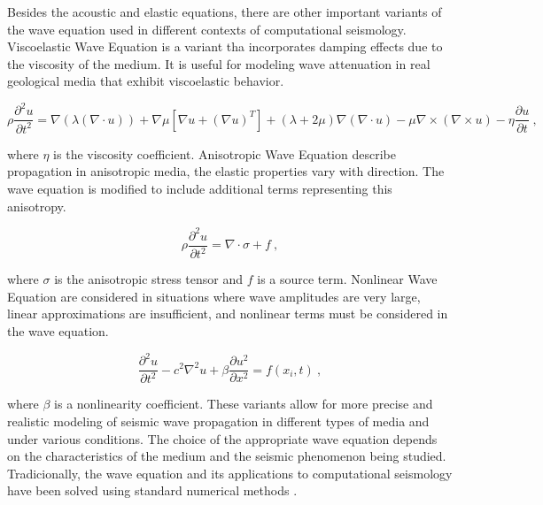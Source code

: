 \documentclass[11pt,twoside]{article}
\begin{document}
Besides the acoustic and elastic equations, there are other important variants of the wave equation used in different 
contexts of computational seismology. Viscoelastic Wave Equation is a variant tha incorporates damping effects due to 
the viscosity of the medium. It is useful for modeling wave attenuation in real geological media that exhibit 
viscoelastic behavior.

\begin{equation*}
\rho \frac{\partial^2 u}{\partial t^2} = \nabla (\lambda (\nabla \cdot u)) + \nabla \mu \left[\nabla u + 
(\nabla u)^T\right] + (\lambda + 2\mu) \nabla (\nabla \cdot u) - \mu \nabla \times (\nabla \times u) - 
\eta \frac{\partial u}{\partial t} \ ,
\label{viscoelastic}
\end{equation*}
    
where $\eta$ is the viscosity coefficient. Anisotropic Wave Equation describe propagation in anisotropic media, 
the elastic properties vary with direction. The wave equation is modified to include additional terms representing 
this anisotropy.

\begin{equation*}
\rho \frac{\partial^2 u}{\partial t^2} = \nabla \cdot \sigma + f \ ,
\label{anisotropic}
\end{equation*}
    
where $\sigma$ is the anisotropic stress tensor and $f$ is a source term. Nonlinear Wave Equation are considered 
in situations where wave amplitudes are very large, linear approximations are insufficient, and nonlinear terms 
must be considered in the wave equation.

\begin{equation*}
\frac{\partial^2 u}{\partial t^2} - c^2 \nabla^2 u + \beta \frac{\partial u^2}{\partial x^2} = f(x_i, t) \ ,
\label{nonlinear}
\end{equation*}
    
where $\beta$ is a nonlinearity coefficient. These variants allow for more precise and realistic modeling 
of seismic wave propagation in different types of media and under various conditions. The choice of the 
appropriate wave equation depends on the characteristics of the medium and the seismic phenomenon being studied. 
Tradicionally, the wave equation and its applications to computational seismology have been solved using standard 
numerical methods \citep{Igel2017}.

\end{document}
